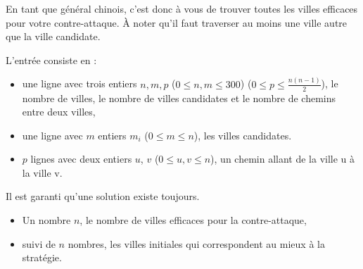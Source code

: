 En tant que général chinois, c'est donc à vous de trouver toutes les villes efficaces pour votre contre-attaque. À noter qu'il faut traverser au moins une ville autre que la ville candidate.

\begin{Input}
    L'entrée consiste en :
    \begin{itemize}
        \item une ligne avec trois entiers $n, m, p$ ($0\leq n, m\leq 300$) ($0 \leq p \leq \frac{n (n-1)}{2}$), le nombre de villes, le nombre de villes candidates et le nombre de chemins entre deux villes,
        \item une ligne avec $m$ entiers $m_i$ ($0 \leq m \leq n$), les villes candidates.
        \item $p$ lignes avec deux entiers $u$, $v$ ($0 \leq u, v \leq n$), un chemin allant de la ville u à la ville v.
    \end{itemize}
    Il est garanti qu'une solution existe toujours.
\end{Input}

\begin{Output}
    \begin{itemize}
        \item Un nombre $n$, le nombre de villes efficaces pour la contre-attaque,
        \item suivi de $n$ nombres, les villes initiales qui correspondent au mieux à la stratégie.
    \end{itemize}
\end{Output}
